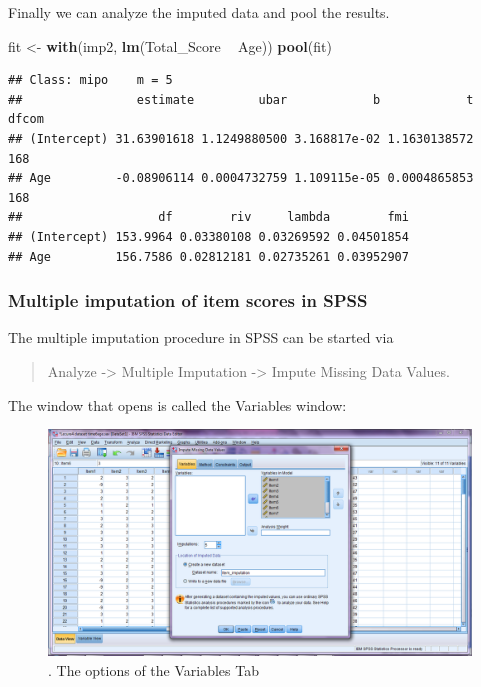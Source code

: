 \documentclass[]{book}
\newenvironment{Shaded}{\begin{snugshade}}{\end{snugshade}}
\newcommand{\KeywordTok}[1]{\textcolor[rgb]{0.13,0.29,0.53}{\textbf{#1}}}
\newcommand{\StringTok}[1]{\textcolor[rgb]{0.31,0.60,0.02}{#1}}
\newcommand{\OperatorTok}[1]{\textcolor[rgb]{0.81,0.36,0.00}{\textbf{#1}}}
\newcommand{\NormalTok}[1]{#1}
\begin{document}
Finally we can analyze the imputed data and pool the results.

\begin{Shaded}
\begin{Highlighting}[]
\NormalTok{fit <-}\StringTok{ }\KeywordTok{with}\NormalTok{(imp2, }\KeywordTok{lm}\NormalTok{(Total_Score }\OperatorTok{~}\StringTok{ }\NormalTok{Age))}
\KeywordTok{pool}\NormalTok{(fit)}
\end{Highlighting}
\end{Shaded}

\begin{verbatim}
## Class: mipo    m = 5 
##                estimate         ubar            b            t dfcom
## (Intercept) 31.63901618 1.1249880500 3.168817e-02 1.1630138572   168
## Age         -0.08906114 0.0004732759 1.109115e-05 0.0004865853   168
##                   df        riv     lambda        fmi
## (Intercept) 153.9964 0.03380108 0.03269592 0.04501854
## Age         156.7586 0.02812181 0.02735261 0.03952907
\end{verbatim}

\subsubsection{Multiple imputation of item scores in
SPSS}\label{multiple-imputation-of-item-scores-in-spss}

The multiple imputation procedure in SPSS can be started via

\begin{quote}
Analyze -\textgreater{} Multiple Imputation -\textgreater{} Impute
Missing Data Values.
\end{quote}

The window that opens is called the Variables window:

\begin{figure}

{\centering \includegraphics[width=0.9\linewidth]{images/fig8.1} 

}

\caption{. The options of the Variables Tab}\label{fig:fig8-1}
\end{figure}
\end{document}
